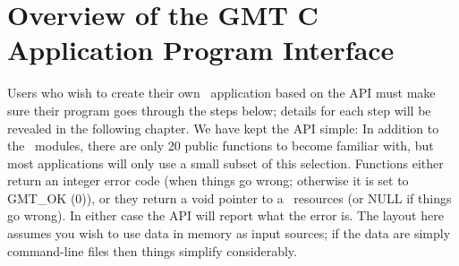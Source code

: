 \documentclass[11pt]{report}
\begin{document}
\chapter{Overview of the GMT C Application Program Interface}
\label{ch:overview}

Users who wish to create their own \GMT\ application based on the API
must make sure their program goes through the steps below; details
for each step will be revealed in the following chapter.  We have kept the
API simple: In addition to the \GMT\ modules, there are only 20 public functions to become familiar with,
but most applications will only use a small subset of this selection.
Functions either return an integer error code (when things go wrong; otherwise it is set to GMT\_OK (0)),
or they return a void pointer to a \GMT\ resources (or NULL if things go wrong).  In either case
the API will report what the error is.
The layout here assumes you wish to use data in memory as input sources; if the data are simply
command-line files then things simplify considerably.
\end{document}

